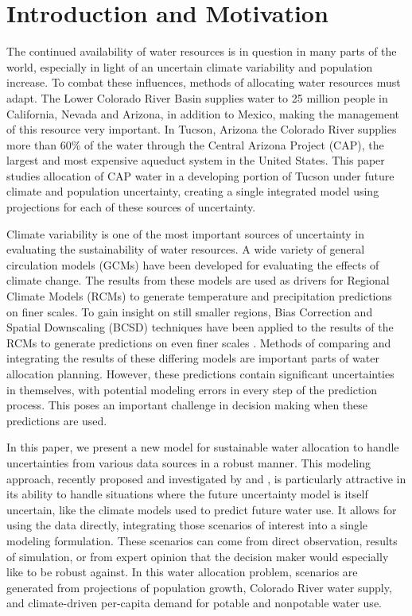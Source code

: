 \documentclass[opre,nonblindrev]{informs3} %
\begin{document}
\section{Introduction and Motivation}

The continued availability of water resources is in question in many parts of the world, especially in light of an uncertain climate variability and population increase.
To combat these influences, methods of allocating water resources must adapt.
The Lower Colorado River Basin supplies water to 25 million people in California, Nevada and Arizona, in addition to Mexico, making the management of this resource very important.
In Tucson, Arizona the Colorado River supplies more than 60\% of the water through the Central Arizona Project (CAP), the largest and most expensive aqueduct system in the United States.
This paper studies allocation of CAP water in a developing portion of Tucson under future climate and population uncertainty, creating a single integrated model using projections for each of these sources of uncertainty.

Climate variability is one of the most important sources of uncertainty in evaluating the sustainability of water resources.
A wide variety of general circulation models (GCMs) have been developed for evaluating the effects of climate change.
The results from these models are used as drivers for Regional Climate Models (RCMs) to generate temperature and precipitation predictions on finer scales.
To gain insight on still smaller regions, Bias Correction and Spatial Downscaling (BCSD) techniques have been applied to the results of the RCMs to generate predictions on even finer scales \citep{bcsdreclamation}.
Methods of comparing and integrating the results of these differing models are important parts of water allocation planning.
However, these predictions contain significant uncertainties in themselves, with potential modeling errors in every step of the prediction process.
This poses an important challenge in decision making when these predictions are used.

In this paper, we present a new model for sustainable water allocation to handle uncertainties from various data sources in a robust manner.
This modeling approach, recently proposed and investigated by \cite{bental2011robust} and \cite{love2013phi}, is particularly attractive in its ability to handle situations where the future uncertainty model is itself uncertain, like the climate models used to predict future water use.
It allows for using the data directly, integrating those scenarios of interest into a single modeling formulation.
These scenarios can come from direct observation, results of simulation, or from expert opinion that the decision maker would especially like to be robust against.
In this water allocation problem, scenarios are generated from projections of population growth, Colorado River water supply, and climate-driven per-capita demand for potable and nonpotable water use.
\end{document}
